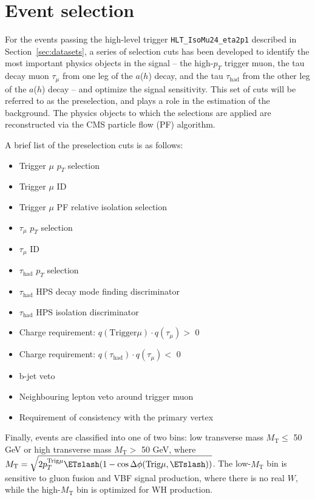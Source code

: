 \chapter{Event selection\label{sec:evtsel}}

For the events passing the high-level trigger \texttt{HLT\_IsoMu24\_eta2p1} described in Section~\ref{sec:datasets}, a series of selection cuts has been developed to identify the most important physics objects in the signal -- the high-$p_T$ trigger muon, the tau decay muon $\tau_{\mu}$ from one leg of the $a$($h$) decay, and the tau $\tau_{\text{had}}$ from the other leg of the $a$($h$) decay -- and optimize the signal sensitivity. This set of cuts will be referred to as the preselection, and plays a role in the estimation of the background. The physics objects to which the selections are applied are reconstructed via the CMS particle flow (PF) algorithm.

A brief list of the preselection cuts is as follows:

\begin{itemize}
	\item Trigger $\mu$ $p_T$ selection
	\item Trigger $\mu$ ID
	\item Trigger $\mu$ PF relative isolation selection
	\item $\tau_{\mu}$ $p_T$ selection
	\item $\tau_{\mu}$ ID
	\item $\tau_{\text{had}}$ $p_T$ selection
	\item $\tau_{\text{had}}$ HPS decay mode finding discriminator
	\item $\tau_{\text{had}}$ HPS isolation discriminator
	\item Charge requirement: $q(\text{Trigger} \mu) \cdot q(\tau_{\mu}) >$ 0
	\item Charge requirement: $q(\tau_{\text{had}}) \cdot q(\tau_{\mu}) <$ 0
        \item b-jet veto
        \item Neighbouring lepton veto around trigger muon
	\item Requirement of consistency with the primary vertex
\end{itemize}

Finally, events are classified into one of two bins: low transverse mass $M_{\text{T}} \le$ 50 GeV or high transverse mass $M_{\text{T}} >$ 50 GeV, where $M_{\text{T}} = \sqrt{2p_{T}^{\text{Trig}\mu}\ETslash(1 - \cos{\Delta\phi(\text{Trig}\mu, \ETslash)})}$.  The low-$M_{\text{T}}$ bin is sensitive to gluon fusion and VBF signal production, where there is no real $W$, while the high-$M_{\text{T}}$ bin is optimized for WH production.

